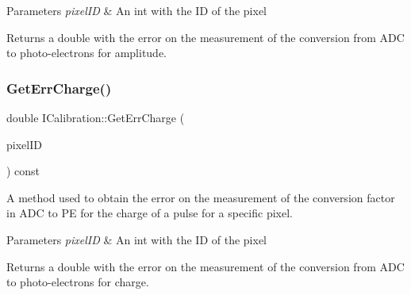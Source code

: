 \begin{DoxyParams}{Parameters}
{\em pixel\+ID} & An int with the ID of the pixel\\
\hline
\end{DoxyParams}
\begin{DoxyReturn}{Returns}
a double with the error on the measurement of the conversion from A\+DC to photo-\/electrons for amplitude. 
\end{DoxyReturn}
\mbox{\label{classICalibration_acbcfe549397fc403e48ab8201f159eee}} 
\subsubsection{\texorpdfstring{Get\+Err\+Charge()}{GetErrCharge()}}
{\footnotesize\ttfamily double I\+Calibration\+::\+Get\+Err\+Charge (\begin{DoxyParamCaption}\item[{int}]{pixel\+ID }\end{DoxyParamCaption}) const}



A method used to obtain the error on the measurement of the conversion factor in A\+DC to PE for the charge of a pulse for a specific pixel. 


\begin{DoxyParams}{Parameters}
{\em pixel\+ID} & An int with the ID of the pixel\\
\hline
\end{DoxyParams}
\begin{DoxyReturn}{Returns}
a double with the error on the measurement of the conversion from A\+DC to photo-\/electrons for charge. 
\end{DoxyReturn}
\mbox{\label{classICalibration_accaa04857537b7774657e76f4b67cbda}} 
